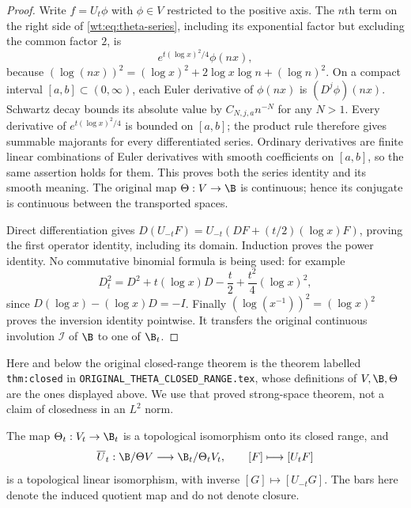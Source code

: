 \begin{proof}
Write $f=U_t\phi$ with $\phi\in V$ restricted to the positive
axis.  The $n$th term on the right side of
\eqref{wt:eq:theta-series}, including its exponential factor but
excluding the common factor $2$, is
\[
 e^{t(\log x)^2/4}\phi(nx),
\]
because
$(\log(nx))^2=(\log x)^2+2\log x\log n+(\log n)^2$.
On a compact interval $[a,b]\subset(0,\infty)$, each Euler
derivative of $\phi(nx)$ is $(D^j\phi)(nx)$.  Schwartz decay
bounds its absolute value by $C_{N,j,a}n^{-N}$ for any $N>1$.
Every derivative of $e^{t(\log x)^2/4}$ is bounded on $[a,b]$;
the product rule therefore gives summable majorants for every
differentiated series.  Ordinary derivatives are finite linear
combinations of Euler derivatives with smooth coefficients on
$[a,b]$, so the same assertion holds for them.  This proves both
the series identity and its smooth meaning.  The original map
$\Theta:V\to\B$ is continuous; hence its conjugate is continuous
between the transported spaces.

Direct differentiation gives
$D(U_{-t}F)=U_{-t}(DF+(t/2)(\log x)F)$, proving the first
operator identity, including its domain.  Induction proves the
power identity.  No commutative binomial formula is being used:
for example
\[
 D_t^2=D^2+t(\log x)D-\frac t2+\frac{t^2}{4}(\log x)^2,
\]
since $D(\log x)- (\log x)D=-I$.  Finally
$(\log(x^{-1}))^2=(\log x)^2$ proves the inversion identity
pointwise.  It transfers the original continuous involution
$\mathcal I$ of $\B$ to one of $\B_t$.
\end{proof}

Here and below the original closed-range theorem is the theorem
labelled \texttt{thm:closed} in
\texttt{ORIGINAL\_THETA\_CLOSED\_RANGE.tex}, whose definitions
of $V,\B,\Theta$ are the ones displayed above.  We use that proved
strong-space theorem, not a claim of closedness in an $L^2$ norm.

\begin{corollary}
\label{wt:cor:quotient}
The map $\Theta_t:V_t\to\B_t$ is a topological isomorphism
onto its closed range, and
\begin{equation}\label{wt:eq:strong-quotient}
 \overline U_t:\B/\Theta V\longrightarrow\B_t/\Theta_tV_t,
 \qquad [F]\longmapsto[U_tF]
\end{equation}
is a topological linear isomorphism, with inverse
$[G]\mapsto[U_{-t}G]$.  The bars here denote the induced quotient
map and do not denote closure.
\end{corollary}

